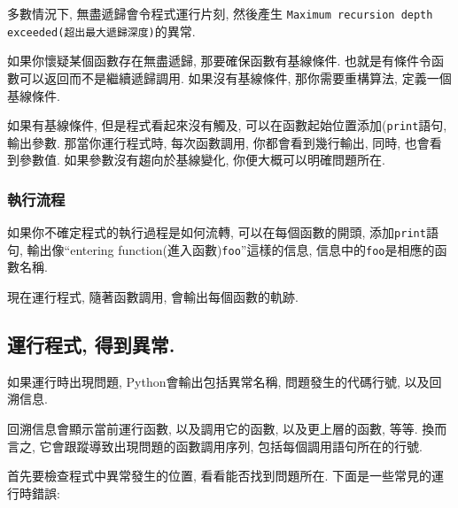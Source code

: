 \documentclass[10pt]{book}
\begin{document}
多數情況下, 無盡遞歸會令程式運行片刻, 然後產生
{\tt Maximum recursion depth exceeded(超出最大遞歸深度)}的異常. 

如果你懷疑某個函數存在無盡遞歸, 那要確保函數有基線條件. 
也就是有條件令函數可以返回而不是繼續遞歸調用. 
如果沒有基線條件, 那你需要重構算法, 定義一個基線條件. 

如果有基線條件, 但是程式看起來沒有觸及, 
可以在函數起始位置添加({\tt print}語句, 輸出參數. 
那當你運行程式時, 每次函數調用, 你都會看到幾行輸出, 
同時, 也會看到參數值. 
如果參數沒有趨向於基線變化, 你便大概可以明確問題所在. 


\subsubsection{執行流程}

如果你不確定程式的執行過程是如何流轉, 
可以在每個函數的開頭, 添加{\tt print}語句, 
輸出像``entering function(進入函數){\tt foo}''這樣的信息, 
信息中的{\tt foo}是相應的函數名稱.

現在運行程式, 隨著函數調用, 會輸出每個函數的軌跡. 


\subsection{運行程式, 得到異常.}

如果運行時出現問題, Python會輸出包括異常名稱, 
問題發生的代碼行號, 以及回溯信息. 

回溯信息會顯示當前運行函數, 以及調用它的函數, 以及更上層的函數, 等等. 
換而言之, 它會跟蹤導致出現問題的函數調用序列, 包括每個調用語句所在的行號. 

首先要檢查程式中異常發生的位置, 
看看能否找到問題所在. 
下面是一些常見的運行時錯誤:
\end{document}
